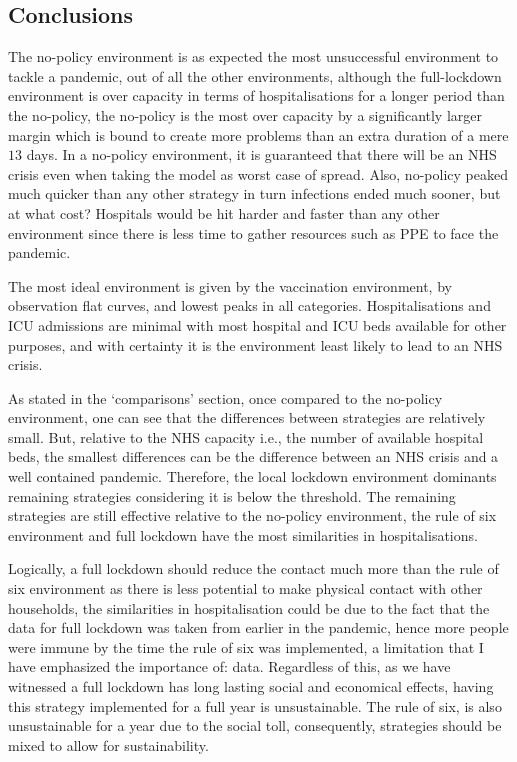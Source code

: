 \documentclass[11pt]{article}
\begin{document}
\subsection{Conclusions}
The no-policy environment is as expected the most unsuccessful environment to tackle a pandemic, out of all the other environments, although the full-lockdown environment is over capacity in terms of hospitalisations for a longer period than the no-policy, the no-policy is the most over capacity by a significantly larger margin which is bound to create more problems than an extra duration of a mere $13$ days. In a no-policy environment, it is guaranteed that there will be an NHS crisis even when taking the model as worst case of spread. Also, no-policy peaked much quicker than any other strategy in turn infections ended much sooner, but at what cost? Hospitals would be hit harder and faster than any other environment since there is less time to gather resources such as PPE to face the pandemic. \par 
The most ideal environment is given by the vaccination environment, by observation flat curves, and lowest peaks in all categories. Hospitalisations and ICU admissions are minimal with most hospital and ICU beds available for other purposes, and with certainty it is the environment least likely to lead to an NHS crisis. \par
As stated in the ‘comparisons’ section, once compared to the no-policy environment, one can see that the differences between strategies are relatively small. But, relative to the NHS capacity i.e., the number of available hospital beds, the smallest differences can be the difference between an NHS crisis and a well contained pandemic. Therefore, the local lockdown environment dominants remaining strategies considering it is below the threshold. The remaining strategies are still effective relative to the no-policy environment, the rule of six environment and full lockdown have the most similarities in hospitalisations. \par
Logically, a full lockdown should reduce the contact much more than the rule of six environment as there is less potential to make physical contact with other households, the similarities in hospitalisation could be due to the fact that the data for full lockdown was taken from earlier in the pandemic, hence more people were immune by the time the rule of six was implemented, a limitation that I have emphasized the importance of: data. Regardless of this, as we have witnessed a full lockdown has long lasting social and economical effects, having this strategy implemented for a full year is unsustainable. The rule of six, is also unsustainable for a year due to the social toll, consequently, strategies should be mixed to allow for sustainability. \par
\end{document}
